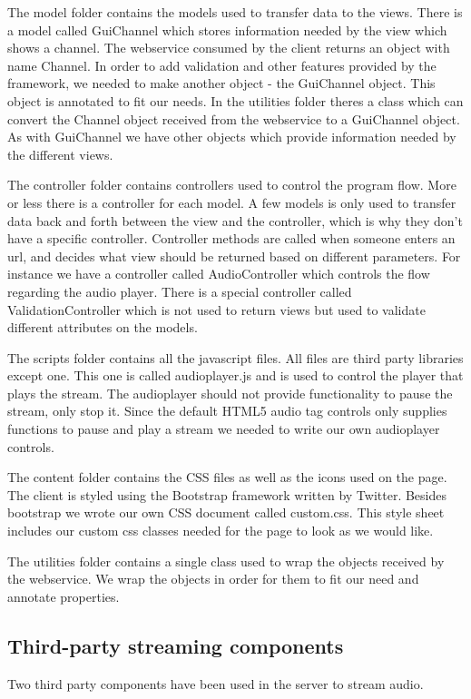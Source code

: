 \documentclass[a4paper,11pt,report]{article}
\begin{document}
The model folder contains the models used to transfer data to the views. There is a model called GuiChannel which stores information needed by the view which shows a channel. The webservice consumed by the client returns an object with name Channel. In order to add validation and other features provided by the framework, we needed to make another object - the GuiChannel object. This object is annotated to fit our needs. In the utilities folder theres a class which can convert the Channel object received from the webservice to a GuiChannel object.
As with GuiChannel we have other objects which provide information needed by the different views.

The controller folder contains controllers used to control the program flow. More or less there is a controller for each model. A few models is only used to transfer data back and forth between the view and the controller, which is why they don’t have a specific controller. Controller methods are called when someone enters an url, and decides what view should be returned based on different parameters. For instance we have a controller called AudioController which controls the flow regarding the audio player. There is a special controller called ValidationController which is not used to return views but used to validate different attributes on the models.

The scripts folder contains all the javascript files. All files are third party libraries except one. This one is called audioplayer.js and is used to control the player that plays the stream. The audioplayer should not provide functionality to pause the stream, only stop it. Since the default HTML5 audio tag controls only supplies functions to pause and play a stream we needed to write our own audioplayer controls.

The content folder contains the CSS files as well as the icons used on the page. The client is styled using the Bootstrap framework written by Twitter. Besides bootstrap we wrote our own CSS document called custom.css. This style sheet includes our custom css classes needed for the page to look as we would like.

The utilities folder contains a single class used to wrap the objects received by the webservice. We wrap the objects in order for them to fit our need and annotate properties.

\subsection{Third-party streaming components}
Two third party components have been used in the server to stream audio.
\end{document}
